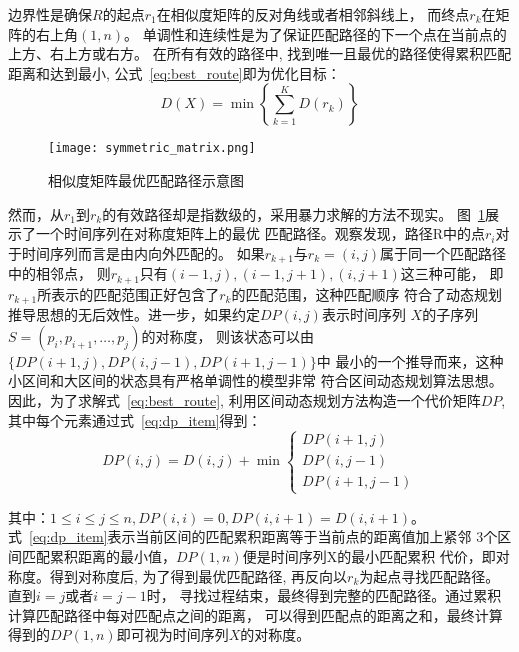 边界性是确保$R$的起点$r_1$在相似度矩阵的反对角线或者相邻斜线上，
而终点$r_k$在矩阵的右上角$\left(1,n\right)$。
单调性和连续性是为了保证匹配路径的下一个点在当前点的上方、右上方或右方。
在所有有效的路径中, 找到唯一且最优的路径使得累积匹配距离和达到最小,
公式~\ref{eq:best_route}即为优化目标：
\begin{equation}
  D(X)=\min \left\{\sum_{k=1}^{K} D\left(r_{k}\right)\right\}
  \label{eq:best_route}
\end{equation}

\begin{figure}
  \centering
  \texttt{[image: symmetric\_matrix.png]}
  \caption{相似度矩阵最优匹配路径示意图}
  \label{fig:symmetric_matrix}
\end{figure}

然而，从$r_1$到$r_k$的有效路径却是指数级的，采用暴力求解的方法不现实。
图~\ref{fig:symmetric_matrix}展示了一个时间序列在对称度矩阵上的最优
匹配路径。观察发现，路径R中的点$r_i$对于时间序列而言是由内向外匹配的。
如果$r_{k+1}$与$r_k=\left(i,j\right)$属于同一个匹配路径中的相邻点，
则$r_{k+1}$只有$(i-1, j),(i-1, j+1),(i, j+1)$这三种可能，
即$r_{k+1}$所表示的匹配范围正好包含了$r_k$的匹配范围，这种匹配顺序
符合了动态规划推导思想的无后效性。进一步，如果约定$D P(i, j)$表示时间序列
$X$的子序列$S=\left(p_{i}, p_{i+1}, \dots, p_{j}\right)$的对称度，
则该状态可以由$\{D P(i+1, j), D P(i, j-1), D P(i+1, j-1)\}$中
最小的一个推导而来，这种小区间和大区间的状态具有严格单调性的模型非常
符合区间动态规划算法思想。因此，为了求解式~\ref{eq:best_route},
利用区间动态规划方法构造一个代价矩阵$DP$, 其中每个元素通过式~\ref{eq:dp_item}得到：
\begin{equation}
  D P(i, j)=D(i, j)+\min \left\{\begin{array}{c}
    D P(i+1, j) \\
    D P(i, j-1) \\
    D P(i+1, j-1)
  \end{array}\right.
  \label{eq:dp_item}
\end{equation}

其中：$1 \leq i \leq j \leq n, D P(i, i)=0, D P(i, i+1)=D(i, i+1)$。
式~\ref{eq:dp_item}表示当前区间的匹配累积距离等于当前点的距离值加上紧邻
3个区间匹配累积距离的最小值，$D P(1, n)$便是时间序列X的最小匹配累积
代价，即对称度。得到对称度后, 为了得到最优匹配路径,
再反向以$r_k$为起点寻找匹配路径。直到$i=j$或者$i=j-1$时，
寻找过程结束，最终得到完整的匹配路径。通过累积计算匹配路径中每对匹配点之间的距离，
可以得到匹配点的距离之和，最终计算得到的$DP(1,n)$即可视为时间序列$X$的对称度。

